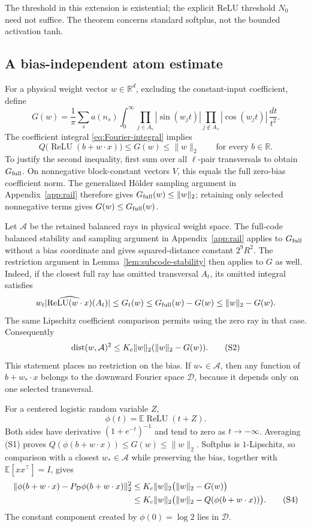 \documentclass[11pt]{article}
\theoremstyle{remark}\newtheorem{remark}[theorem]{Remark}
\newcommand{\R}{\mathbb R}\newcommand{\E}{\mathbb E}\newcommand{\Prb}{\mathbb P}
\newcommand{\relu}{\operatorname{ReLU}}\newcommand{\Var}{\operatorname{Var}}
\begin{document}
The threshold in this extension is existential; the explicit ReLU
threshold $N_0$ need not suffice. The theorem concerns standard softplus,
not the bounded activation tanh.

\subsection{A bias-independent atom estimate}

For a physical weight vector $w\in\R^d$, excluding the constant-input
coefficient, define
\[
 G(w)=\frac1\pi\sum_s a(n_s)\int_0^\infty
 \prod_{j\in A_s}|\sin(w_jt)|
 \prod_{j\notin A_s}|\cos(w_jt)|\,\frac{dt}{t^2}.
\]
The coefficient integral \eqref{eq:Fourier-integral} implies
\[
 Q\bigl(\relu(b+w\cdot x)\bigr)\le G(w)\le\|w\|_2
 \qquad\text{for every }b\in\R.
 \tag{S1}
\]
To justify the second inequality, first sum over all $\ell$-pair
transversals to obtain $G_{\rm full}$. On nonnegative block-constant
vectors $V$, this equals the full zero-bias coefficient norm.
The generalized H\"older sampling argument in Appendix~\ref{app:rail}
therefore gives $G_{\rm full}(w)\le\|w\|_2$; retaining only selected
nonnegative terms gives $G(w)\le G_{\rm full}(w)$.

Let $\mathcal A$ be the retained balanced rays in physical weight
space. The full-code balanced stability and sampling argument in
Appendix~\ref{app:rail} applies to $G_{\rm full}$ without a bias
coordinate and gives squared-distance constant $2^9R^2$.
The restriction argument in Lemma~\ref{lem:subcode-stability} then
applies to $G$ as well. Indeed, if the closest full ray has omitted
transversal $A_t$, its omitted integral satisfies
\[
 w_t|\widehat{\relu(w\cdot x)}(A_t)|
 \le G_t(w)\le G_{\rm full}(w)-G(w)\le\|w\|_2-G(w).
\]
The same Lipschitz coefficient comparison permits using the zero ray
in that case. Consequently
\[
 \operatorname{dist}(w,\mathcal A)^2\le K_c\|w\|_2(\|w\|_2-G(w)).
 \tag{S2}
\]
This statement places no restriction on the bias. If $w_*\in\mathcal A$,
then any function of $b+w_*\cdot x$ belongs to the downward Fourier
space $\mathcal D$, because it depends only on one selected transversal.

For a centered logistic random variable $Z$,
\[
 \phi(t)=\E\relu(t+Z).
 \tag{S3}
\]
Both sides have derivative $(1+e^{-t})^{-1}$ and tend to zero as
$t\to-\infty$. Averaging (S1) proves
$Q(\phi(b+w\cdot x))\le G(w)\le\|w\|_2$.
Softplus is $1$-Lipschitz, so comparison with a closest $w_*\in\mathcal A$
while preserving the bias, together with $\E[xx^\top]=I$, gives
\begin{align}
 \|\phi(b+w\cdot x)-P_{\mathcal D}\phi(b+w\cdot x)\|_2^2
 &\le K_c\|w\|_2\bigl(\|w\|_2-G(w)\bigr)\notag\\
 &\le K_c\|w\|_2
       \bigl(\|w\|_2-Q(\phi(b+w\cdot x))\bigr).
 \tag{S4}
\end{align}
The constant component created by $\phi(0)=\log2$ lies in $\mathcal D$.
\end{document}
